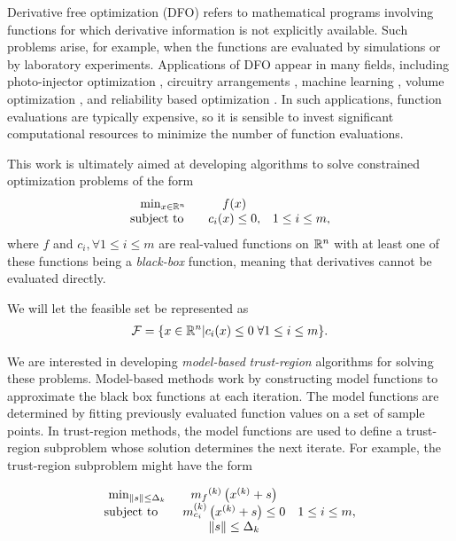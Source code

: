 

Derivative free optimization (DFO) refers to mathematical programs involving functions for which derivative information is not explicitly available.
Such problems arise, for example, when the functions are evaluated by simulations or by laboratory experiments.  Applications of DFO appear in many fields, including photo-injector optimization \cite{1742-6596-874-1-012062}, circuitry arrangements \cite{PLOSKAS201816}, machine learning \cite{KS2018}, volume optimization \cite{Cheng2017}, and reliability based optimization \cite{Gao2017}.
In such applications, function evaluations are typically expensive, so it is sensible to invest significant computational resources to minimize the number of function evaluations.

This work is ultimately aimed at developing algorithms to solve constrained optimization problems of the form 
\begin{align}
\begin{array}{ccl} \min_{x \in \mathbb R^n} & f(x) \\
\mbox{subject to} \quad & c_i(x) \le 0, & 1 \le i \le m,
\end{array}
\label{the_dfo_problem}
\end{align}
where 
$f$ and $c_i, \forall 1 \le i \le m$ are real-valued functions on $\mathbb R^n$ with at least one of these functions being a {\em black-box} function, meaning that derivatives cannot be evaluated directly.

We will let the feasible set be represented as 
\begin{align}
{\mathcal F} = \{x \in \mathbb R^n | c_i(x) \le 0 \; \forall 1 \le i \le m \}.
\end{align}

We are interested in developing {\em model-based} {\em trust-region} algorithms for solving these problems.
Model-based methods work by constructing model functions to approximate the black box functions at each iteration.
The model functions are determined by fitting previously evaluated function values on a set of sample points.
In trust-region methods, the model functions are used to define a trust-region subproblem whose solution determines the next iterate.
For example, the trust-region subproblem might have the form

\begin{align*}
\begin{array}{ccl} \min_{\|s\| \le \Delta_k}
 & {{m}_f}^{(k)} \left(x^{(k)}+s\right) \\
\mbox{subject to} \quad & {{m}^{(k)}_{c_i}}\left(x^{(k)} + s\right) \le 0 & 1 \le i \le m, \\
& \|s\| \le \Delta_k \\
\end{array}
\end{align*}

